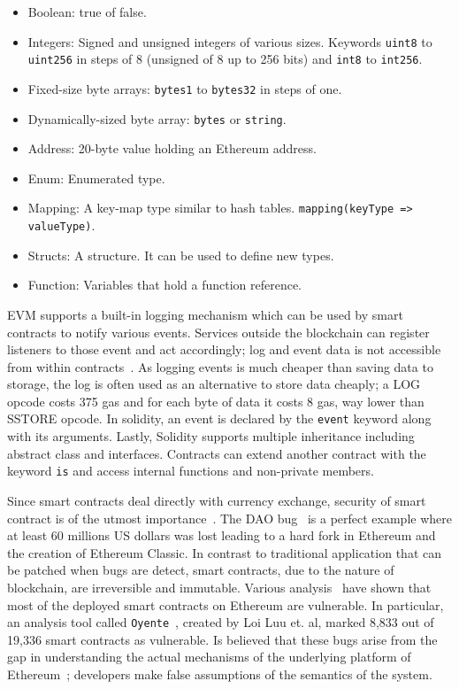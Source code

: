 \begin{itemize}
  \item Boolean: true of false.
  \item Integers: Signed and unsigned integers of various sizes. Keywords \verb|uint8| to \verb|uint256| in steps of  8 (unsigned of 8 up to 256 bits) and \verb|int8| to  \verb|int256|.
  \item Fixed-size byte arrays: \verb|bytes1| to  \verb|bytes32| in steps of one.
  \item Dynamically-sized byte array: \verb|bytes| or \verb|string|.
  \item Address: 20-byte value holding an Ethereum address.
  \item Enum: Enumerated type.
  \item Mapping: A key-map type similar to hash tables. \verb|mapping(keyType => valueType)|.
  \item Structs: A structure. It can be used to define new types.
  \item Function: Variables that hold a function reference.
\end{itemize}

EVM supports a built-in logging mechanism which can be used by smart contracts to notify various events. Services outside the blockchain can register listeners to those event and act accordingly; log and event data is not accessible from within contracts~\cite{solidity}. As logging events is much cheaper than saving data to storage, the log is often used as an alternative to store data cheaply; a LOG opcode costs 375 gas and for each byte of data it costs 8 gas, way lower than SSTORE opcode. In solidity, an event is declared by the \verb|event| keyword along with its arguments. Lastly, Solidity supports multiple inheritance including abstract class and interfaces. Contracts can extend another contract with the keyword \verb|is| and access internal functions and non-private members.

Since smart contracts deal directly with currency exchange, security of smart contract is of the utmost importance~\cite{safe_smart_contracts, smart_contracts_smarter}. The DAO bug~\cite{dao, dao_2} is a perfect example where at least 60 millions US dollars was lost leading to a hard fork in Ethereum and the creation of Ethereum Classic. In contrast to traditional application that can be patched when bugs are detect, smart contracts, due to the nature of blockchain, are irreversible and immutable. Various analysis~\cite{safe_smart_contracts, smart_contracts_smarter} have shown that most of the deployed smart contracts on Ethereum are vulnerable. In particular, an analysis tool called \verb|Oyente|~\cite{smart_contracts_smarter}, created by Loi Luu et. al, marked 8,833 out of 19,336 smart contracts as vulnerable. Is believed that these bugs arise from the gap in understanding the actual mechanisms of the underlying platform of Ethereum~\cite{smart_contracts_smarter}; developers make false assumptions of the semantics of the system.

